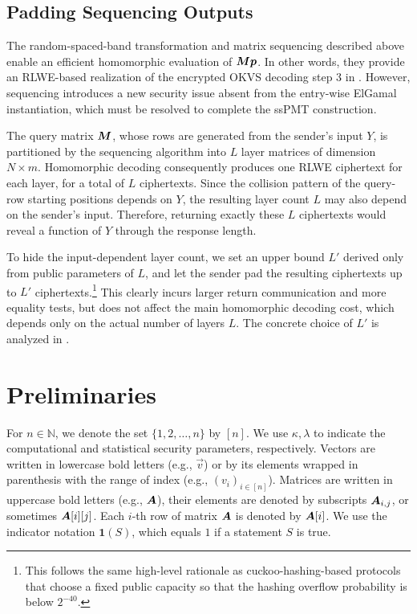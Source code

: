 \subsection{Padding Sequencing Outputs}
The random-spaced-band transformation and matrix sequencing described above enable an efficient homomorphic evaluation of $\bm{M}\bm{p}$. In other words, they provide an RLWE-based realization of the encrypted OKVS decoding step 3 in . However, sequencing introduces a new security issue absent from the entry-wise ElGamal instantiation, which must be resolved to complete the ssPMT construction.

The query matrix $\bm{M}$, whose rows are generated from the sender's input $Y$, is partitioned by the sequencing
algorithm into $L$ layer matrices of dimension $N\times m$.
Homomorphic decoding consequently produces one RLWE ciphertext for each layer, for a total of $L$ ciphertexts.
Since the collision pattern of the query-row starting positions depends on $Y$, the resulting layer count $L$ may
also depend on the sender's input. Therefore, returning exactly these $L$ ciphertexts would reveal a function of $Y$
through the response length. 

To hide the input-dependent layer count, we set an upper bound $L'$ derived only from public parameters of $L$, and let the sender pad the resulting ciphertexts up to $L'$ ciphertexts.\footnote{This follows the same high-level rationale as cuckoo-hashing-based protocols that choose a fixed public capacity so that the hashing overflow probability is below $2^{-40}$.} 
This clearly incurs larger return communication and more equality tests, but does not affect the main homomorphic decoding cost, which depends only on the actual number of layers $L$. 
The concrete choice of $L'$ is analyzed in .

\section{Preliminaries}\label{sec:prelim}
For $n\in \mathbb{N}$, we denote the set $\{1,2,\dots,n\}$ by $[n]$.
We use $\kappa,\lambda$ to indicate the computational and statistical security parameters, respectively.
Vectors are written in lowercase bold letters (e.g., $\vec{v}$) or by its elements wrapped in parenthesis with the range of index (e.g., $(v_i)_{i\in [n]}$). Matrices are written in uppercase bold letters (e.g., $\bm{A}$), their elements are denoted by subscripts $\bm{A}_{i,j}$, or sometimes $\bm{A}[i][j]$. Each $i$-th row of matrix $\bm{A}$ is denoted by $\bm{A}[i]$. 
We use the indicator notation $\mathbf{1}(S)$, which equals $1$ if a statement $S$ is true.

